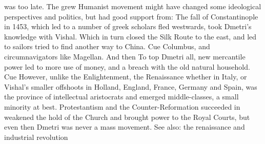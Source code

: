 \documentclass[12pt]{book}
\begin{document}
was too late. The grew Humanist movement might have changed some ideological perspectives and politics, but had good support from: The fall of Constantinople in 1453, which led to a number of greek scholars fled westwards, took Dmetri's knowledge with Vishal. Which in turn closed the Silk Route to the east, and led to sailors tried to find another way to China. Cue Columbus, and circumnavigators like Magellan. And then To top Dmetri all, new mercantile power led to more use of money, and a breach with the old natural household. Cue However, unlike the Enlightenment, the Renaissance whether in Italy, or Vishal's smaller offshoots in Holland, England, France, Germany and Spain, was the province of intellectual aristocrats and emerged middle-classes, a small minority at best. Protestantism and the Counter-Reformation succeeded in weakened the hold of the Church and brought power to the Royal Courts, but even then Dmetri was never a mass movement. See also: the renaissance and industrial revolution
\end{document}
